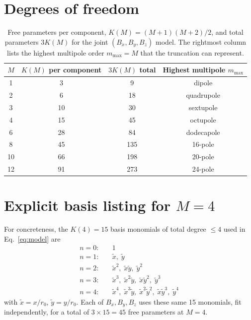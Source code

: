 \documentclass[11pt]{article}
\begin{document}
\section{Degrees of freedom}
\label{sec:dof}

\begin{table}[htbp]
\centering
\caption{Free parameters per component, $K(M) = (M+1)(M+2)/2$, and
         total parameters $3K(M)$ for the joint
         $(B_x, B_y, B_z)$ model. The rightmost column lists the
         highest multipole order $m_{\max} = M$ that the
         truncation can represent.}
\label{tab:dof}
\begin{tabular}{c c c c}
\toprule
$M$ & $K(M)$ per component & $3K(M)$ total &
      Highest multipole $m_{\max}$ \\
\midrule
1  &  3  &   9 & dipole \\
2  &  6  &  18 & quadrupole \\
3  & 10  &  30 & sextupole \\
4  & 15  &  45 & octupole \\
6  & 28  &  84 & dodecapole \\
8  & 45  & 135 & 16-pole \\
10 & 66  & 198 & 20-pole \\
12 & 91  & 273 & 24-pole \\
\bottomrule
\end{tabular}
\end{table}

\appendix
\section{Explicit basis listing for $M = 4$}
\label{app:m4}

For concreteness, the $K(4) = 15$ basis monomials of total degree
$\le 4$ used in Eq.~\eqref{eq:model} are
%
\begin{align*}
n = 0:\quad & 1 \\
n = 1:\quad & \tilde{x},\; \tilde{y} \\
n = 2:\quad & \tilde{x}^{2},\; \tilde{x}\tilde{y},\; \tilde{y}^{2} \\
n = 3:\quad & \tilde{x}^{3},\; \tilde{x}^{2}\tilde{y},\;
              \tilde{x}\tilde{y}^{2},\; \tilde{y}^{3} \\
n = 4:\quad & \tilde{x}^{4},\; \tilde{x}^{3}\tilde{y},\;
              \tilde{x}^{2}\tilde{y}^{2},\;
              \tilde{x}\tilde{y}^{3},\; \tilde{y}^{4}
\end{align*}
%
with $\tilde{x} = x / r_0$, $\tilde{y} = y / r_0$.
Each of $B_x, B_y, B_z$ uses these same 15 monomials, fit
independently, for a total of $3 \times 15 = 45$ free parameters
at $M = 4$.
\end{document}
